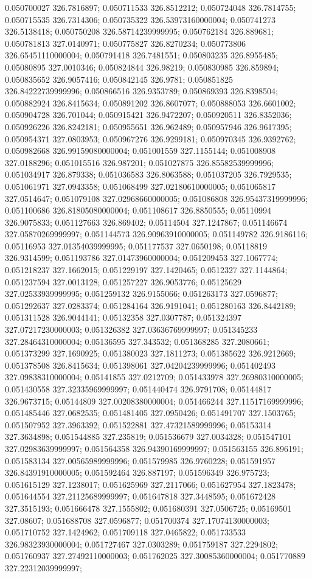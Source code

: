 0.050700027 326.7816897; 0.050711533 326.8512212; 0.050724048 326.7814755; 0.050715535 326.7314306; 0.050735322 326.53973160000004; 0.050741273 326.5138418; 0.050750208 326.58714239999995; 0.050762184 326.889681; 0.050781813 327.0140971; 0.050775827 326.8270234; 0.050773806 326.65451110000004; 0.050791418 326.7481551; 0.050803235 326.8955485; 0.05080895 327.0010346; 0.050824844 326.98219; 0.050830985 326.859894; 0.050835652 326.9057416; 0.050842145 326.9781; 0.050851825 326.84222739999996; 0.050866516 326.9353789; 0.050869393 326.8398504; 0.050882924 326.8415634; 0.050891202 326.8607077; 0.050888053 326.6601002; 0.050904728 326.701044; 0.050915421 326.9472207; 0.050920511 326.8352036; 0.050926226 326.8242181; 0.050955651 326.962489; 0.050957946 326.9617395; 0.050954371 327.0803953; 0.050967276 326.9299181; 0.050970345 326.9392762; 0.050982668 326.99159080000004; 0.051001559 327.1155144; 0.051008908 327.0188296; 0.051015516 326.987201; 0.051027875 326.85582539999996; 0.051034917 326.879338; 0.051036583 326.8063588; 0.051037205 326.7929535; 0.051061971 327.0943358; 0.051068499 327.02180610000005; 0.051065817 327.0514647; 0.051079108 327.02968660000005; 0.051086808 326.95437319999996; 0.051100686 326.81805080000004; 0.051108617 326.8850555; 0.05110994 326.9075833; 0.051127663 326.869402; 0.05114504 327.1247867; 0.051146674 327.05870269999997; 0.051144573 326.90963910000005; 0.051149782 326.9186116; 0.05116953 327.01354039999995; 0.051177537 327.0650198; 0.05118819 326.9314599; 0.051193786 327.01473960000004; 0.051209453 327.1067774; 0.051218237 327.1662015; 0.051229197 327.1420465; 0.0512327 327.1144864; 0.051237594 327.0013128; 0.051257227 326.9053776; 0.05125629 327.02533939999995; 0.051259132 326.9155066; 0.051263173 327.0596877; 0.051292637 327.0283374; 0.051284164 326.9191041; 0.051280163 326.8442189; 0.051311528 326.9044141; 0.05132358 327.0307787; 0.051324397 327.07217230000003; 0.051326382 327.03636769999997; 0.051345233 327.28464310000004; 0.05136595 327.343532; 0.051368285 327.2080661; 0.051373299 327.1690925; 0.051380023 327.1811273; 0.051385622 326.9212669; 0.051378508 326.8415634; 0.051398061 327.04204239999996; 0.051402493 327.09838310000004; 0.05141855 327.0212709; 0.051433978 327.26980310000005; 0.051430558 327.32335969999997; 0.051440474 326.9791708; 0.05144817 326.9673715; 0.05144809 327.00208380000004; 0.051466244 327.11517169999996; 0.051485446 327.0682535; 0.051481405 327.0950426; 0.051491707 327.1503765; 0.051507952 327.3963392; 0.051522881 327.47321589999996; 0.05153314 327.3634898; 0.051544885 327.235819; 0.051536679 327.0034328; 0.051547101 327.02983639999997; 0.051564358 326.94390169999997; 0.051563155 326.896191; 0.051583134 327.00565989999996; 0.051579985 326.9760228; 0.051591957 326.84391910000005; 0.051592464 326.887197; 0.051596349 326.975723; 0.051615129 327.1238017; 0.051625969 327.2117066; 0.051627954 327.1823478; 0.051644554 327.21125689999997; 0.051647818 327.3448595; 0.051672428 327.3515193; 0.051666478 327.1555802; 0.051680391 327.0506725; 0.05169501 327.08607; 0.051688708 327.0596877; 0.051700374 327.17074130000003; 0.051710752 327.1424962; 0.051709118 327.0465822; 0.051733533 326.98323930000004; 0.051727467 327.0303289; 0.051759187 327.2294802; 0.051760937 327.27492110000003; 0.051762025 327.30085360000004; 0.051770889 327.22312039999997; 